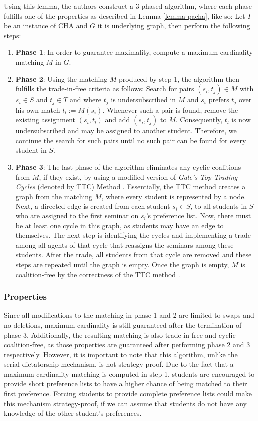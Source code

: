 Using this lemma, the authors \cite{SngThesis, Abraham:Pacha} construct a 3-phased algorithm, where each phase fulfills one of the properties as described in Lemma \ref{lemma-pacha}, like so: Let $I$ be an instance of CHA and $G$ it is underlying graph, then perform the following steps:
\begin{enumerate}
    \item \textbf{Phase 1}: In order to guarantee maximality, compute a maximum-cardinality matching $M$ in $G$.
    \item \textbf{Phase 2}: Using the matching $M$ produced by step 1, the algorithm then fulfills the trade-in-free criteria as follows: Search for pairs $(s_i, t_j) \in M$ with $s_i \in S$ and $t_j \in T$ and where $t_j$ is undersubscribed in $M$ and $s_i$ prefers $t_j$ over his own match $t_l := M(s_i)$. Whenever such a pair is found, remove the existing assignment $(s_i, t_l)$ and add $(s_i, t_j)$ to $M$. Consequently, $t_l$ is now undersubscribed and may be assigned to another student. Therefore, we continue the search for such pairs until no such pair can be found for every student in $S$.
    \item \textbf{Phase 3}: The last phase of the algorithm eliminates any cyclic coalitions from $M$, if they exist, by using a modified version of \emph{Gale's Top Trading Cycles} (denoted by TTC) Method \cite{ShapleyTTC}. Essentially, the TTC method creates a graph from the matching $M$, where every student is represented by a node. Next, a directed edge is created from each student $s_i \in S$, to all students in $S$ who are assigned to the first seminar on $s_i$'s preference list. Now, there must be at least one cycle in this graph, as students may have an edge to themselves. The next step is identifying the cycles and implementing a trade among all agents of that cycle that reassigns the seminars among these students. After the trade, all students from that cycle are removed and these steps are repeated until the graph is empty. Once the graph is empty, $M$ is coalition-free by the correctness of the TTC method \cite{Abraham:Pacha}.
\end{enumerate}

\subsubsection{Properties}
Since all modifications to the matching in phase 1 and 2 are limited to swaps and no deletions, maximum cardinality is still guaranteed after the termination of phase 3. Additionally, the resulting matching is also trade-in-free and cyclic-coalition-free, as those properties are guaranteed after performing phase 2 and 3 respectively. However, it is important to note that this algorithm, unlike the serial dictatorship mechanism, is not strategy-proof. Due to the fact that a maximum-cardinality matching is computed in step 1, students are encouraged to provide short preference lists to have a higher chance of being matched to their first preference. Forcing students to provide complete preference lists could make this mechanism strategy-proof, if we can assume that students do not have any knowledge of the other student's preferences.

